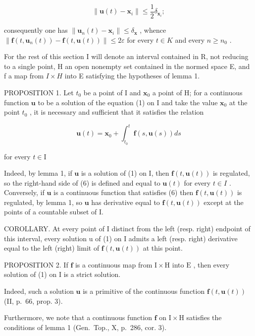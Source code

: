 \[
\left\| \mathbf {u} (t) - \mathbf {x} _ {i} \right\| \leqslant \frac {1}{2} \delta_ {\mathbf {x} _ {i}};
\]

consequently one has \(\|\mathbf{u}_{n}(t)-\mathbf{x}_{i}\|\leqslant\delta_{\mathbf{x}}\) , whence \(\|\mathbf{f}(t,\mathbf{u}_{n}(t))-\mathbf{f}(t,\mathbf{u}(t))\|\leqslant2\varepsilon\) for every \(t\in K\) and every \(n\geqslant n_{0}\) .

For the rest of this section I will denote an interval contained in R, not reducing to a single point, H an open nonempty set contained in the normed space E, and f a map from \(I \times H\) into E satisfying the hypotheses of lemma 1.

PROPOSITION 1. Let \(t_0\) be a point of I and \(\mathbf{x}_0\) a point of H; for a continuous function \(\mathbf{u}\) to be a solution of the equation (1) on I and take the value \(\mathbf{x}_0\) at the point \(t_0\) , it is necessary and sufficient that it satisfies the relation

\[
\mathbf {u} (t) = \mathbf {x} _ {0} + \int_ {t _ {0}} ^ {t} \mathbf {f} (s, \mathbf {u} (s)) d s\tag{6}
\]

for every \(t\in \mathrm{I}\)

Indeed, by lemma 1, if \(\mathbf{u}\) is a solution of (1) on I, then \(\mathbf{f}(t, \mathbf{u}(t))\) is regulated, so the right-hand side of (6) is defined and equal to \(\mathbf{u}(t)\) for every \(t \in I\) . Conversely, if \(\mathbf{u}\) is a continuous function that satisfies (6) then \(\mathbf{f}(t, \mathbf{u}(t))\) is regulated, by lemma 1, so \(\mathbf{u}\) has derivative equal to \(\mathbf{f}(t, \mathbf{u}(t))\) except at the points of a countable subset of I.

COROLLARY. At every point of I distinct from the left (resp. right) endpoint of this interval, every solution u of (1) on I admits a left (resp. right) derivative equal to the left (right) limit of \(\mathbf{f}(t,\mathbf{u}(t))\) at this point.

PROPOSITION 2. If \(\mathbf{f}\) is a continuous map from \(\mathrm{I} \times \mathrm{H}\) into \(\mathrm{E}\) , then every solution of (1) on \(\mathrm{I}\) is a strict solution.

Indeed, such a solution \(\mathbf{u}\) is a primitive of the continuous function \(\mathbf{f}(t,\mathbf{u}(t))\) (II, p.~66, prop. 3).

Furthermore, we note that a continuous function \(\mathbf{f}\) on \(\mathrm{I} \times \mathrm{H}\) satisfies the conditions of lemma 1 (Gen.~Top., X, p.~286, cor. 3).

